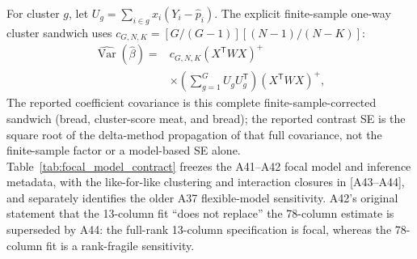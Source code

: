 \documentclass[twocolumn,linenumbers]{aastex702}
\begin{document}
For cluster $g$, let
$U_g=\sum_{i\in g}x_i(Y_i-\widehat p_i)$. The explicit finite-sample
one-way cluster sandwich uses
$c_{G,N,K}=[G/(G-1)][(N-1)/(N-K)]$:
\begin{equation}
\begin{aligned}
\widehat{\operatorname{Var}}(\widehat\beta)
={}&c_{G,N,K}(X^{\mathsf T}WX)^{+} \\
&\times\left(\sum_{g=1}^{G}U_gU_g^{\mathsf T}\right)
(X^{\mathsf T}WX)^{+},
\end{aligned}
\label{eq:focal_sandwich}
\end{equation}
The reported coefficient covariance is this complete finite-sample-corrected
sandwich (bread, cluster-score meat, and bread); the reported contrast SE is
the square root of the delta-method propagation of that full covariance, not
the finite-sample factor or a model-based SE alone.
Table~\ref{tab:focal_model_contract} freezes the A41--A42 focal model and
inference metadata, with the like-for-like clustering and interaction
closures in [A43--A44], and separately identifies the older A37 flexible-model
sensitivity. A42's original statement that the 13-column fit ``does not
replace'' the 78-column estimate is superseded by A44: the full-rank
13-column specification is focal, whereas the 78-column fit is a
rank-fragile sensitivity.
\end{document}
